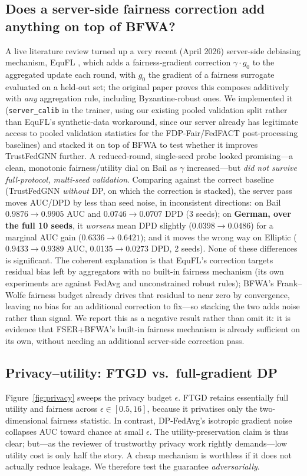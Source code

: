 \documentclass[pdflatex,sn-mathphys-num]{sn-jnl}
\theoremstyle{thmstyleone}%
\theoremstyle{thmstyletwo}%
\theoremstyle{thmstylethree}%
\begin{document}
\subsection{Does a server-side fairness correction add anything on top of BFWA?}
\label{sec:exp-equfl}
A live literature review turned up a very recent (April 2026) server-side
debiasing mechanism, EquFL \cite{yu2026equfl}, which adds a fairness-gradient
correction $\gamma\cdot g_0$ to the aggregated update each round, with $g_0$
the gradient of a fairness surrogate evaluated on a held-out set; the original
paper proves this composes additively with \emph{any} aggregation rule,
including Byzantine-robust ones. We implemented it (\texttt{server\_calib} in
the trainer, using our existing pooled validation split rather than EquFL's
synthetic-data workaround, since our server already has legitimate access to
pooled validation statistics for the FDP-Fair/FedFACT post-processing
baselines) and stacked it on top of BFWA to test whether it improves
TrustFedGNN further. A reduced-round, single-seed probe looked promising---a
clean, monotonic fairness/utility dial on Bail as $\gamma$ increased---but
\emph{did not survive full-protocol, multi-seed validation}. Comparing against
the correct baseline (TrustFedGNN \emph{without} DP, on which the correction is
stacked), the server pass moves AUC/DPD by less than seed noise, in inconsistent
directions: on Bail $0.9876{\to}0.9905$ AUC and $0.0746{\to}0.0707$ DPD (3 seeds);
on \textbf{German, over the full 10 seeds}, it \emph{worsens} mean DPD slightly
($0.0398{\to}0.0486$) for a marginal AUC gain ($0.6336{\to}0.6421$); and it moves
the wrong way on Elliptic ($0.9433{\to}0.9389$ AUC, $0.0135{\to}0.0273$ DPD,
2 seeds). None of these differences is significant. The coherent explanation is that
EquFL's correction targets residual bias left by aggregators with no built-in
fairness mechanism (its own experiments are against FedAvg and unconstrained
robust rules); BFWA's Frank--Wolfe fairness budget already drives that
residual to near zero by convergence, leaving no bias for an additional
correction to fix---so stacking the two adds noise rather than signal. We
report this as a negative result rather than omit it: it is evidence that
FSER+BFWA's built-in fairness mechanism is already sufficient on its own,
without needing an additional server-side correction pass.

\subsection{Privacy--utility: FTGD vs.\ full-gradient DP}
\label{sec:exp-privacy}
Figure~\ref{fig:privacy} sweeps the privacy budget $\epsilon$. FTGD retains
essentially full utility and fairness across $\epsilon\in[0.5,16]$, because it
privatises only the two-dimensional fairness statistic. In contrast, DP-FedAvg's
isotropic gradient noise collapses AUC toward chance at small $\epsilon$. The
utility-preservation claim is thus clear; but---as the reviewer of trustworthy
privacy work rightly demands---low utility cost is only half the story. A cheap
mechanism is worthless if it does not actually reduce leakage. We therefore test
the guarantee \emph{adversarially}.
\end{document}
